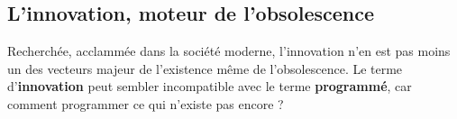 \subsection{L'innovation, moteur de l'obsolescence}
Recherchée, acclammée dans la société moderne, l'innovation n'en est pas moins un des vecteurs majeur de l'existence même de l'obsolescence. Le terme d'\textbf{innovation} peut sembler incompatible avec le terme \textbf{programmé}, car comment programmer ce qui n'existe pas encore ? 
